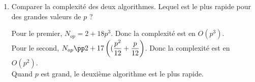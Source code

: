 \documentclass[a4paper,12pt]{article}
\begin{document}
\begin{enumerate}
\begin{enumerate}
\begin{solution}
Second algorithme :
\begin{itemize}
\item une assignation
\item $\lfloor \frac{p}{3}\rfloor $ it\' erations de la premi\` ere boucle,
\item $\lfloor \frac{p-a}{2}\rfloor $ it\' erations de la deuxi\` eme boucle,
\begin{itemize}
\item 2 soustractions
\item fonction rectangle : $N_{rect}$=13
\item 1 test 
\item un append
\end{itemize}
\item un return
\end{itemize}
La complexit\' e du premier algorithme est : $N_{op}=2+\dsum_{a=1}^{\lfloor \frac{p}{3}\rfloor}\dsum_{b=a}^{\lfloor \frac{p-a}{2}\rfloor} 17$.\\
On utilisera l'encadrement : $x-1\pp \lfloor x\rfloor \pp x$.\\
$N_{op}=2+17\dsum_{a=1}^{\lfloor \frac{p}{3}\rfloor} (\lfloor \frac{p-a}{2}\rfloor -a+1)\pp 2+17 \dsum_{a=1}^{\lfloor \frac{p}{3}\rfloor} (\frac{p-a}{2}+1-a)$\\
$N_{op}\pp 2+17 \dsum_{a=1}^{\lfloor \frac{p}{3}\rfloor} (\frac{p}{2}+1-\frac{3}{2}a)=2+17\left[(\frac{p}{2}+1)(\lfloor \frac{p}{3}\rfloor)-\frac{3}{2}\dfrac{\lfloor \frac{p}{3}\rfloor(\lfloor \frac{p}{3}\rfloor+1)}{2}\right]$.\\
$N_{op}\pp 2+17 \dfrac{p}{3}\left[(\frac{p}{2}+1)-\frac{3}{2}\dfrac{(\frac{p}{3}+1)}{2}\right]=2+17(\dfrac{p^2}{12}+\dfrac{p}{12} )$.\\
\end{solution}
\item Comparer la complexit\' e des deux algorithmes. Lequel est le plus rapide pour des grandes valeurs de $p$ ?
\begin{solution}
Pour le premier, $N_{op}=2+18p^3$. Donc la complexit\' e est en $O(p^3)$.\\
Pour le second, $N_{op}\pp 2+17\left( (\dfrac{p^2}{12}+\dfrac{p}{12} \right)$. Donc la complexit\' e est en $O(p^2)$.\\
Quand $p$ est grand, le deuxi\` eme algorithme est le plus rapide.
\end{solution}
\end{enumerate} 
\end{enumerate}
\end{document}
